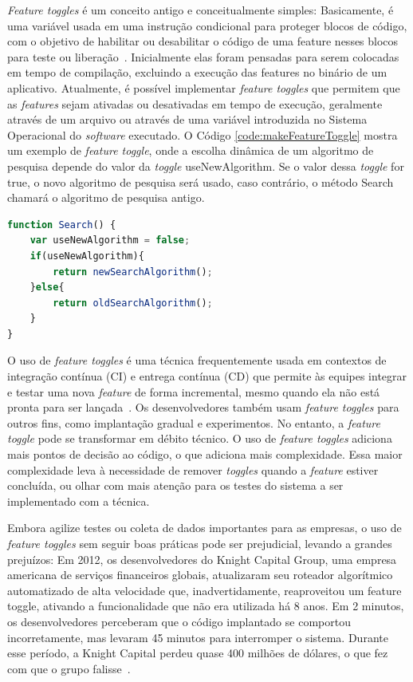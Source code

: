 \documentclass[portugues]{ic-tese}
\begin{document}
\textit{Feature toggles} é um conceito antigo e conceitualmente simples: Basicamente, é uma variável usada em uma instrução condicional para proteger blocos de código, com o objetivo de habilitar ou desabilitar o código de uma feature nesses blocos para teste ou liberação~\citep{Rahman_2016}. Inicialmente elas foram pensadas para serem colocadas em tempo de compilação, excluindo a execução das features no binário de um aplicativo. Atualmente, é possível implementar \textit{feature toggles} que permitem que as \textit{features} sejam ativadas ou desativadas em tempo de execução, geralmente através de um arquivo ou através de uma variável introduzida no Sistema Operacional do \textit{software} executado. O Código \ref{code:makeFeatureToggle} mostra um exemplo de \textit{feature toggle}, onde a escolha dinâmica de um algoritmo de pesquisa depende do valor da \textit{toggle} useNewAlgorithm. Se o valor dessa \textit{toggle} for true, o novo algoritmo de pesquisa será usado, caso contrário, o método Search chamará o algoritmo de pesquisa antigo.

\begin{lstlisting}[language=JavaScript, label={code:makeFeatureToggle}, caption=Implementação de uma \textit{Feature Toggle}~\citep{Mahdavi-hezaveh_2021}]
function Search() {
    var useNewAlgorithm = false;
    if(useNewAlgorithm){
        return newSearchAlgorithm();
    }else{
        return oldSearchAlgorithm();
    }
}
\end{lstlisting}

O uso de \textit{feature toggles} é uma técnica frequentemente usada em contextos de integração contínua (CI) e entrega contínua (CD) que permite às equipes integrar e testar uma nova \textit{feature} de forma incremental, mesmo quando ela não está pronta para ser lançada~\citep{Mahdavi-hezaveh_2021}. Os desenvolvedores também usam \textit{feature toggles} para outros fins, como implantação gradual e experimentos. No entanto, a \textit{feature toggle} pode se transformar em débito técnico. O uso de \textit{feature toggles} adiciona mais pontos de decisão ao código, o que adiciona mais complexidade. Essa maior complexidade leva à necessidade de remover \textit{toggles} quando a \textit{feature} estiver concluída, ou olhar com mais atenção para os testes do sistema a ser implementado com a técnica.

Embora agilize testes ou coleta de dados importantes para as empresas, o uso de \textit{feature toggles} sem seguir boas práticas pode ser prejudicial, levando a grandes prejuízos: Em 2012, os desenvolvedores do Knight Capital Group, uma empresa americana de serviços financeiros globais, atualizaram seu roteador algorítmico automatizado de alta velocidade que, inadvertidamente, reaproveitou um feature toggle, ativando a funcionalidade que não era utilizada há 8 anos. Em 2 minutos, os desenvolvedores perceberam que o código implantado se comportou incorretamente, mas levaram 45 minutos para interromper o sistema. Durante esse período, a Knight Capital perdeu quase 400 milhões de dólares, o que fez com que o grupo falisse~\citep{Mahdavi-hezaveh_2021}. 
\end{document}
